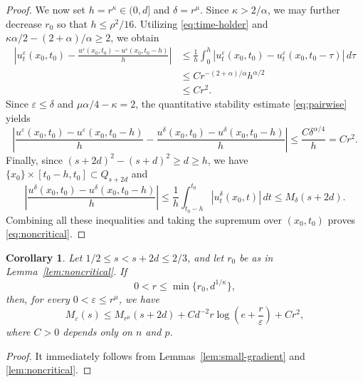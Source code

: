 \documentclass[a4paper,11pt]{amsart}
\theoremstyle{plain}
\newtheorem{corollary}[theorem]{Corollary}
\theoremstyle{definition}
\numberwithin{equation}{section}
\begin{document}
\begin{proof}
We now set $h=r^\kappa \in (0, d]$ and $\delta=r^\mu$. Since $\kappa>2/\alpha$, we may further decrease $r_0$ so that $h\leq\rho^2/16$. Utilizing \eqref{eq:time-holder} and $\kappa\alpha/2-(2+\alpha)/\alpha\geq2$, we obtain
\begin{equation*}
\begin{aligned}
    \left|u_t^\varepsilon(x_0,t_0)-\frac{u^\varepsilon(x_0,t_0)-u^\varepsilon(x_0,t_0-h)}{h}\right| &\leq \frac{1}{h}\int_0^h|u_t^\varepsilon(x_0,t_0)-u_t^\varepsilon(x_0,t_0-\tau)|\,d\tau\\
    &\leq Cr^{-(2+\alpha)/\alpha}h^{\alpha/2} \\
&\leq Cr^2.
\end{aligned}
\end{equation*}
Since $\varepsilon\leq\delta$ and $\mu\alpha/4-\kappa=2$, the quantitative stability estimate \eqref{eq:pairwise} yields
\begin{equation*}
\left|\frac{u^\varepsilon(x_0,t_0)-u^\varepsilon(x_0,t_0-h)}{h}
-\frac{u^\delta(x_0,t_0)-u^\delta(x_0,t_0-h)}{h}\right|
\leq\frac{C\delta^{\alpha/4}}{h}=Cr^2.
\end{equation*}
Finally, since $(s+2d)^2-(s+d)^2\geq d\geq h$, we have $\{x_0\}\times[t_0-h,t_0]\subset Q_{s+2d}$ and
\begin{equation*}
\left|\frac{u^\delta(x_0,t_0)-u^\delta(x_0,t_0-h)}{h}\right|
\leq \frac1h\int_{t_0-h}^{t_0}|u_t^\delta(x_0,t)|\,dt\leq M_\delta(s+2d).
\end{equation*}
Combining all these inequalities and taking the supremum over $(x_0,t_0)$ proves \eqref{eq:noncritical}.
\end{proof}

\begin{corollary}\label{cor:one-step}
Let $1/2\leq s<s+2d\leq2/3$, and let $r_0$ be as in Lemma~\ref{lem:noncritical}. If
\begin{equation*}
0<r\leq\min\{r_0,d^{1/\kappa}\},
\end{equation*}
then, for every $0<\varepsilon\leq r^\mu$, we have
\begin{equation*}
M_\varepsilon(s)
\leq M_{r^\mu}(s+2d)+Cd^{-2}r\log\left(e+\frac r\varepsilon\right)+Cr^2,
\end{equation*}
where $C>0$ depends only on $n$ and $p$.
\end{corollary}

\begin{proof}
It immediately follows from Lemmas~\ref{lem:small-gradient} and \ref{lem:noncritical}.
\end{proof}
\end{document}
